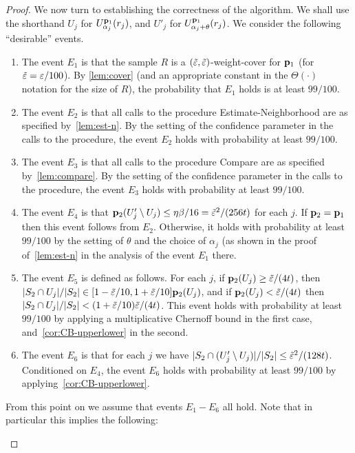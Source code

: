 \begin{proof}
We now turn to establishing the correctness of the algorithm.
We shall use the shorthand $U_j$ for $U^{\mathbf{p}_1}_{\alpha_j}(r_j)$,
and $U'_j$ for $U^{\mathbf{p}_1}_{\alpha_j+\theta}(r_j)$.
We consider the following ``desirable'' events.
\begin{enumerate}
\item The event $E_1$ is that the sample $R$ is a
$(\tilde{\varepsilon},\tilde{\varepsilon})$-weight-cover for $\mathbf{p}_1$ (for
$\tilde{\varepsilon} = \varepsilon/100$). By
\cref{lem:cover} (and an appropriate
constant in the $\Theta(\cdot)$ notation for the
size of $R$), the probability that $E_1$ holds is
at least $99/100$.
\item The event $E_2$ is that all calls to the procedure
{\sc Estimate-Neighborhood} are as specified by~\cref{lem:est-n}.
By the setting of the confidence parameter in the calls to the procedure,
the event $E_2$ holds with probability at least $99/100$.
\item The event $E_3$ is that all calls to the procedure
{\sc Compare} are as specified by~\cref{lem:compare}.
By the setting of the confidence parameter in the calls to the procedure,
the event $E_3$ holds with probability at least $99/100$.
\item The event $E_4$ is that
 $\mathbf{p}_2(U'_j \setminus U_j) \leq \eta\beta/16 = \tilde{\varepsilon}^2/({256} t)$
 for each $j$. If $\mathbf{p}_2 = \mathbf{p}_1$ then this event follows from
 $E_2$. Otherwise,  it holds with probability at least $99/100$
 by the setting
of $\theta$ and the choice of $\alpha_j$
 (as shown in the proof of~\cref{lem:est-n} in the analysis
 of the event $E_1$ there.\item The event $E_5$ is defined as follows. For each $j$,
  if $\mathbf{p}_2(U_j) \geq \tilde{\varepsilon}/(4t)$, then
  $|S_2 \cap U_j|/|S_2| \in [1-\tilde{\varepsilon}/10,1+\tilde{\varepsilon}/10]\mathbf{p}_2(U_j)$,
   and if
  $\mathbf{p}_2(U_j) < \tilde{\varepsilon}/(4t)$ then
  $|S_2 \cap U_j|/|S_2| < (1+\tilde{\varepsilon}/10)\tilde{\varepsilon}/(4t)$.  This event holds with
  probability at least $99/100$ by applying a multiplicative
  Chernoff bound in the first case, and~\cref{cor:CB-upperlower} in the second.
\item The event $E_6$ is that for each $j$ we have
  $|S_2 \cap (U'_j\setminus U_j)|/|S_2| \leq \tilde{\varepsilon}^2/({128} t)$.
  Conditioned on $E_4$, the event $E_6$ holds
  with probability at least $99/100$ by applying~\cref{cor:CB-upperlower}.
\end{enumerate}
From this point on we assume that events $E_1-E_6$ all hold.
Note that in particular this implies the following:
\begin{enumerate}

\end{enumerate}
\end{proof}
